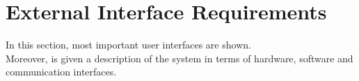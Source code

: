 \section{External Interface Requirements}

In this section, most important user interfaces are shown.\\
Moreover, is given a description of the system in terms of hardware, 
software and communication interfaces.




